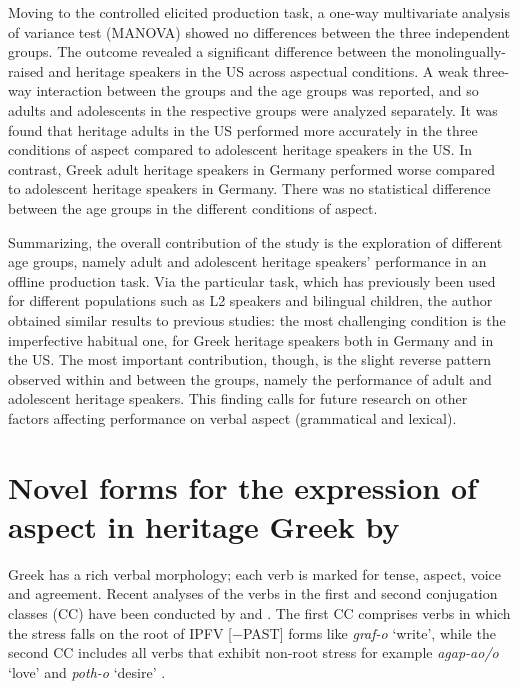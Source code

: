 \documentclass[output=paper,colorlinks,citecolor=brown]{langscibook}
\begin{document}
Moving to the controlled elicited production task, a one-way multivariate analysis of variance test (MANOVA) showed no differences between the three independent groups. The outcome revealed a significant difference between the monolingually-raised and heritage speakers in the US across aspectual conditions. A weak three-way interaction between the groups and the age groups was reported, and so adults and adolescents in the respective groups were analyzed separately. It was found that heritage adults in the US performed more accurately in the three conditions of aspect compared to adolescent heritage speakers in the US. In contrast, Greek adult heritage speakers in Germany performed worse compared to adolescent heritage speakers in Germany. There was no statistical difference between the age groups in the different conditions of aspect. 

Summarizing, the overall contribution of the study is the exploration of different age groups, namely adult and adolescent heritage speakers' performance in an offline production task. Via the particular task, which has previously been used for different populations such as L2 speakers and bilingual children, the author obtained similar results to previous studies: the most challenging condition is the imperfective habitual one, for Greek heritage speakers both in Germany and in the US. The most important contribution, though, is the slight reverse pattern observed within and between the groups, namely the performance of adult and adolescent heritage speakers. This finding calls for future research on other factors affecting performance on verbal aspect (grammatical and lexical). 

\section{Novel forms for the expression of aspect in heritage Greek by \textcite{novelforms}} \label{study-novel-forms}

Greek has a rich verbal morphology; each verb is marked for tense, aspect, voice and agreement. Recent analyses of the verbs in the first and second conjugation classes (CC) have been conducted by \textcite{spyropoulos2017root} and \textcite{revithiadou2019changing}. The first CC comprises verbs in which the stress falls on the root of IPFV [−PAST] forms like \textit{graf-o} `write', while the second CC includes all verbs that exhibit non-root stress for example \textit{agap-ao/o} `love' and \textit{poth-o} `desire' \textcite[126--136]{holton1997greek}.
\end{document}
